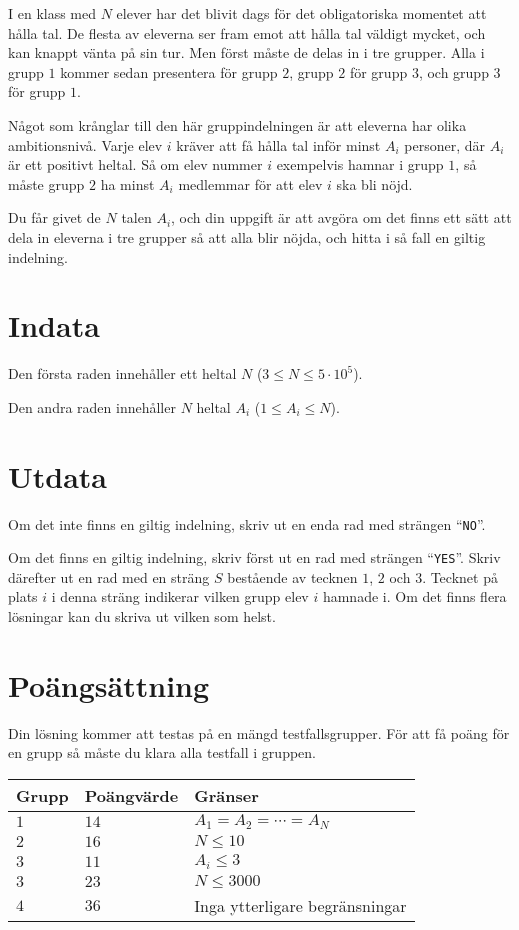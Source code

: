 

I en klass med $N$ elever har det blivit dags för det obligatoriska momentet att hålla tal. 
De flesta av eleverna ser fram emot att hålla tal väldigt mycket, och kan knappt vänta på sin tur.
Men först måste de delas in i tre grupper. Alla i grupp $1$ kommer sedan presentera för grupp $2$, 
grupp $2$ för grupp $3$, och grupp $3$ för grupp $1$. 

Något som krånglar till den här gruppindelningen är att eleverna har olika ambitionsnivå. Varje elev $i$
kräver att få hålla tal inför minst $A_i$ personer, där $A_i$ är ett positivt heltal. Så om elev
nummer $i$ exempelvis hamnar i grupp $1$, så måste grupp $2$ ha minst $A_i$ medlemmar för att elev 
$i$ ska bli nöjd.

Du får givet de $N$ talen $A_i$, och din uppgift är att avgöra om det finns ett sätt att dela in eleverna
i tre grupper så att alla blir nöjda, och hitta i så fall en giltig indelning.


\section*{Indata}
Den första raden innehåller ett heltal $N$ ($3 \leq N \leq 5 \cdot 10^5$).

Den andra raden innehåller $N$ heltal $A_i$ ($1 \leq A_i \leq N$).

\section*{Utdata}

Om det inte finns en giltig indelning, skriv ut en enda rad med strängen ``\texttt{NO}''.

Om det finns en giltig indelning, skriv först ut en rad med strängen ``\texttt{YES}''. 
Skriv därefter ut en rad med en sträng $S$ bestående av tecknen $1$, $2$ och $3$. Tecknet på
plats $i$ i denna sträng indikerar vilken grupp elev $i$ hamnade i. Om det finns flera lösningar
kan du skriva ut vilken som helst.

\section*{Poängsättning}
Din lösning kommer att testas på en mängd testfallsgrupper.
För att få poäng för en grupp så måste du klara alla testfall i gruppen.

\noindent
\begin{tabular}{| l | l | p{12cm} |}
  \hline
  Grupp & Poängvärde & Gränser \\ \hline
  $1$   & $14$       & $A_1 = A_2 = \cdots = A_N$\\ \hline
  $2$   & $16$       & $N \leq 10$  \\ \hline
  $3$   & $11$       & $A_i \leq 3$ \\ \hline
  $3$   & $23$       & $N \leq 3000$ \\ \hline
  $4$   & $36$       & Inga ytterligare begränsningar \\ \hline
\end{tabular}
